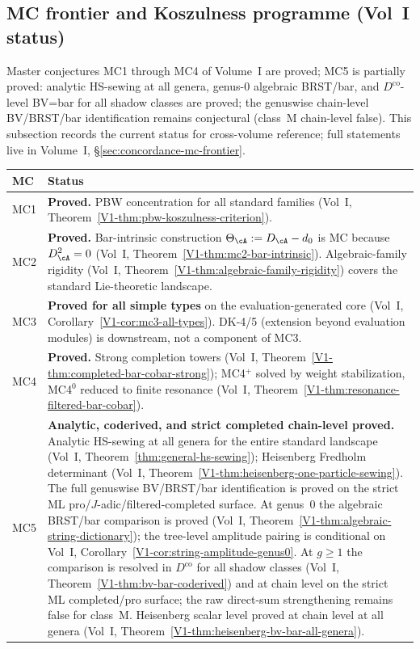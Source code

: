 \subsection{MC frontier and Koszulness programme (Vol~I status)}

Master conjectures MC1 through MC4 of Volume~I are proved;
MC5 is partially proved: analytic HS-sewing at all genera,
genus-$0$ algebraic BRST/bar, and $D^{\mathrm{co}}$-level BV=bar
for all shadow classes are proved; the genuswise chain-level
BV/BRST/bar identification remains conjectural (class~M chain-level
false). This subsection records the current
status for cross-volume reference; full statements live in
Volume~I, \S\ref*{sec:concordance-mc-frontier}.

\begin{center}
\renewcommand{\arraystretch}{1.3}
\begin{tabular}{lp{}}
\textbf{MC} & \textbf{Status} \\
\hline
MC1 & \textbf{Proved.} PBW concentration for all standard families
 (Vol~I, Theorem~\ref*{V1-thm:pbw-koszulness-criterion}). \\
MC2 & \textbf{Proved.} Bar-intrinsic construction
 $\Theta_\cA := D_\cA - d_0$ is MC because $D_\cA^2 = 0$
 (Vol~I, Theorem~\ref*{V1-thm:mc2-bar-intrinsic}).
 Algebraic-family rigidity
 (Vol~I, Theorem~\ref*{V1-thm:algebraic-family-rigidity})
 covers the standard Lie-theoretic landscape. \\
MC3 & \textbf{Proved for all simple types} on the
 evaluation-generated core
 (Vol~I, Corollary~\ref*{V1-cor:mc3-all-types}).
 DK-4/5 (extension beyond evaluation modules)
 is downstream, not a component of MC3. \\
MC4 & \textbf{Proved.} Strong completion towers
 (Vol~I, Theorem~\ref*{V1-thm:completed-bar-cobar-strong});
 MC4${}^+$ solved by weight stabilization,
 MC4${}^0$ reduced to finite resonance
 (Vol~I, Theorem~\ref*{V1-thm:resonance-filtered-bar-cobar}). \\
MC5 & \textbf{Analytic, coderived, and strict completed chain-level proved.} Analytic HS-sewing at all
 genera for the entire standard landscape
 (Vol~I, Theorem~\ref*{thm:general-hs-sewing});
 Heisenberg Fredholm determinant
 (Vol~I, Theorem~\ref*{V1-thm:heisenberg-one-particle-sewing}).
 The full genuswise BV/BRST/bar identification is proved on the
 strict ML pro/$J$-adic/filtered-completed surface. At genus~$0$ the algebraic BRST/bar comparison is
 proved
 (Vol~I, Theorem~\ref*{V1-thm:algebraic-string-dictionary});
 the tree-level amplitude pairing is conditional on
 Vol~I, Corollary~\ref*{V1-cor:string-amplitude-genus0}.
 At $g \geq 1$ the comparison is resolved in $D^{\mathrm{co}}$
 for all shadow classes
 (Vol~I, Theorem~\ref*{V1-thm:bv-bar-coderived}) and at chain level
 on the strict ML completed/pro surface; the raw direct-sum
 strengthening remains false for class~M.
 Heisenberg scalar level proved at chain level at all genera
 (Vol~I, Theorem~\ref*{V1-thm:heisenberg-bv-bar-all-genera}).
\end{tabular}
\end{center}

